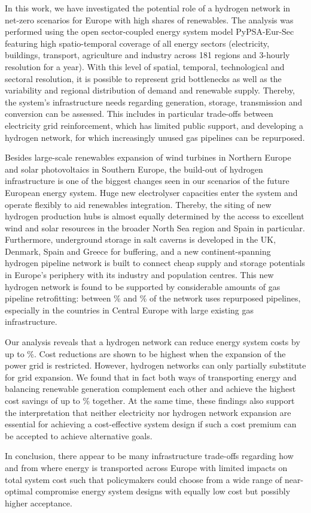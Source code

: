 In this work, we have investigated the potential role of a hydrogen network in
net-zero \co scenarios for Europe with high shares of renewables. The analysis
was performed using the open sector-coupled energy system model PyPSA-Eur-Sec
featuring high spatio-temporal coverage of all energy sectors (electricity,
buildings, transport, agriculture and industry across 181 regions and 3-hourly
resolution for a year). With this level of spatial, temporal, technological and
sectoral resolution, it is possible to represent grid bottlenecks as well as the
variability and regional distribution of demand and renewable supply. Thereby,
the system's infrastructure needs regarding generation, storage, transmission
and conversion can be assessed. This includes in particular trade-offs between
electricity grid reinforcement, which has limited public support, and developing
a hydrogen network, for which increasingly unused gas pipelines can be
repurposed.

Besides large-scale renewables expansion of wind turbines in Northern Europe and
solar photovoltaics in Southern Europe, the build-out of hydrogen infrastructure
is one of the biggest changes seen in our scenarios of the future European
energy system. Huge new electrolyser capacities enter the system and operate
flexibly to aid renewables integration. Thereby, the siting of new hydrogen
production hubs is almost equally determined by the access to excellent wind and
solar resources in the broader North Sea region and Spain in particular.
Furthermore, underground storage in salt caverns is developed in the UK,
Denmark, Spain and Greece for buffering, and a new continent-spanning hydrogen
pipeline network is built to connect cheap supply and storage potentials in
Europe's periphery with its industry and population centres. This new hydrogen
network is found to be supported by considerable amounts of gas pipeline
retrofitting: between \minretroshare\% and \maxretroshare\% of the network uses
repurposed pipelines, especially in the countries in Central Europe with large
existing gas infrastructure.

Our analysis reveals that a hydrogen network can reduce energy system costs by
up to \maxhybenefitrel\%. Cost reductions are shown to be highest when the
expansion of the power grid is restricted. However, hydrogen networks can only
partially substitute for grid expansion. We found that in fact both ways of
transporting energy and balancing renewable generation complement each other and
achieve the highest cost savings of up to \gridbenefitrel\% together. At the
same time, these findings also support the interpretation that neither
electricity nor hydrogen network expansion are essential for achieving a
cost-effective system design if such a cost premium can be accepted to achieve
alternative goals.

In conclusion, there appear to be many infrastructure trade-offs regarding how
and from where energy is transported across Europe with limited impacts on total
system cost such that policymakers could choose from a wide range of
near-optimal compromise energy system designs with equally low cost but possibly
higher acceptance.

